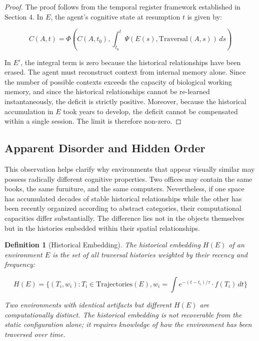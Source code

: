\documentclass[12pt,oneside]{article}
\newtheorem{definition}{Definition}[section]
\theoremstyle{remark}
\begin{document}
\begin{proof}
The proof follows from the temporal register framework established in Section 4. In $E$, the agent's cognitive state at resumption $t$ is given by:

\begin{equation}
C(A, t) = \Phi\left(C(A, t_0), \int_{t_0}^{t} \Psi(E(s), \text{Traversal}(A, s)) \, ds\right)
\end{equation}

In $E'$, the integral term is zero because the historical relationships have been erased. The agent must reconstruct context from internal memory alone. Since the number of possible contexts exceeds the capacity of biological working memory, and since the historical relationships cannot be re-learned instantaneously, the deficit is strictly positive. Moreover, because the historical accumulation in $E$ took years to develop, the deficit cannot be compensated within a single session. The limit is therefore non-zero.
\end{proof}

\subsection{Apparent Disorder and Hidden Order}

This observation helps clarify why environments that appear visually similar may possess radically different cognitive properties. Two offices may contain the same books, the same furniture, and the same computers. Nevertheless, if one space has accumulated decades of stable historical relationships while the other has been recently organized according to abstract categories, their computational capacities differ substantially. The difference lies not in the objects themselves but in the histories embedded within their spatial relationships.

\begin{definition}[Historical Embedding]
The historical embedding $H(E)$ of an environment $E$ is the set of all traversal histories weighted by their recency and frequency:

\begin{equation}
H(E) = \{(T_i, w_i) : T_i \in \text{Trajectories}(E), w_i = \int e^{-(t - t_i)/\tau} \cdot f(T_i) \, dt\}
\end{equation}

Two environments with identical artifacts but different $H(E)$ are computationally distinct. The historical embedding is not recoverable from the static configuration alone; it requires knowledge of how the environment has been traversed over time.
\end{definition}
\end{document}
